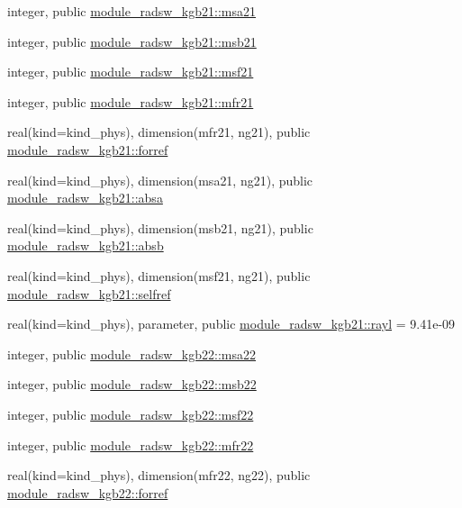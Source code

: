 \begin{DoxyCompactItemize}
\item 
integer, public \hyperlink{namespacemodule__radsw__kgb21_a235b17e9b4b37668028c572f80e1188a}{module\+\_\+radsw\+\_\+kgb21\+::msa21}
\item 
integer, public \hyperlink{namespacemodule__radsw__kgb21_a59710ca5b31c30385ea968c0f01e2e81}{module\+\_\+radsw\+\_\+kgb21\+::msb21}
\item 
integer, public \hyperlink{namespacemodule__radsw__kgb21_ae70b5abfa847419cbf189d2502c34ddd}{module\+\_\+radsw\+\_\+kgb21\+::msf21}
\item 
integer, public \hyperlink{namespacemodule__radsw__kgb21_a5575239aa9d55abcca1ac1f82dc4c4ec}{module\+\_\+radsw\+\_\+kgb21\+::mfr21}
\item 
real(kind=kind\+\_\+phys), dimension(mfr21, ng21), public \hyperlink{namespacemodule__radsw__kgb21_ac93d473e0309275f03a89b161377a034}{module\+\_\+radsw\+\_\+kgb21\+::forref}
\item 
real(kind=kind\+\_\+phys), dimension(msa21, ng21), public \hyperlink{namespacemodule__radsw__kgb21_a7cce83c282d3efec6a3fe319480c270a}{module\+\_\+radsw\+\_\+kgb21\+::absa}
\item 
real(kind=kind\+\_\+phys), dimension(msb21, ng21), public \hyperlink{namespacemodule__radsw__kgb21_a1d3f12f050c90be49f109205c463b29b}{module\+\_\+radsw\+\_\+kgb21\+::absb}
\item 
real(kind=kind\+\_\+phys), dimension(msf21, ng21), public \hyperlink{namespacemodule__radsw__kgb21_a76fc3e4566fcee982b99b10ea562ba93}{module\+\_\+radsw\+\_\+kgb21\+::selfref}
\item 
real(kind=kind\+\_\+phys), parameter, public \hyperlink{namespacemodule__radsw__kgb21_a8df418599fb8aef5fc8f2935a913b361}{module\+\_\+radsw\+\_\+kgb21\+::rayl} = 9.\+41e-\/09
\item 
integer, public \hyperlink{namespacemodule__radsw__kgb22_a4134c2cd3b31db5e0adb5c3c2ad87905}{module\+\_\+radsw\+\_\+kgb22\+::msa22}
\item 
integer, public \hyperlink{namespacemodule__radsw__kgb22_a3398f8d12ec0349b44197873ac58fd98}{module\+\_\+radsw\+\_\+kgb22\+::msb22}
\item 
integer, public \hyperlink{namespacemodule__radsw__kgb22_a0903a020c9e4a4f7c21911d2ab98fd46}{module\+\_\+radsw\+\_\+kgb22\+::msf22}
\item 
integer, public \hyperlink{namespacemodule__radsw__kgb22_a0afe8facbe4837a22c96a0d2000a20ee}{module\+\_\+radsw\+\_\+kgb22\+::mfr22}
\item 
real(kind=kind\+\_\+phys), dimension(mfr22, ng22), public \hyperlink{namespacemodule__radsw__kgb22_a509916fac772945555a1b3fd0d002c93}{module\+\_\+radsw\+\_\+kgb22\+::forref}

\end{DoxyCompactItemize}
